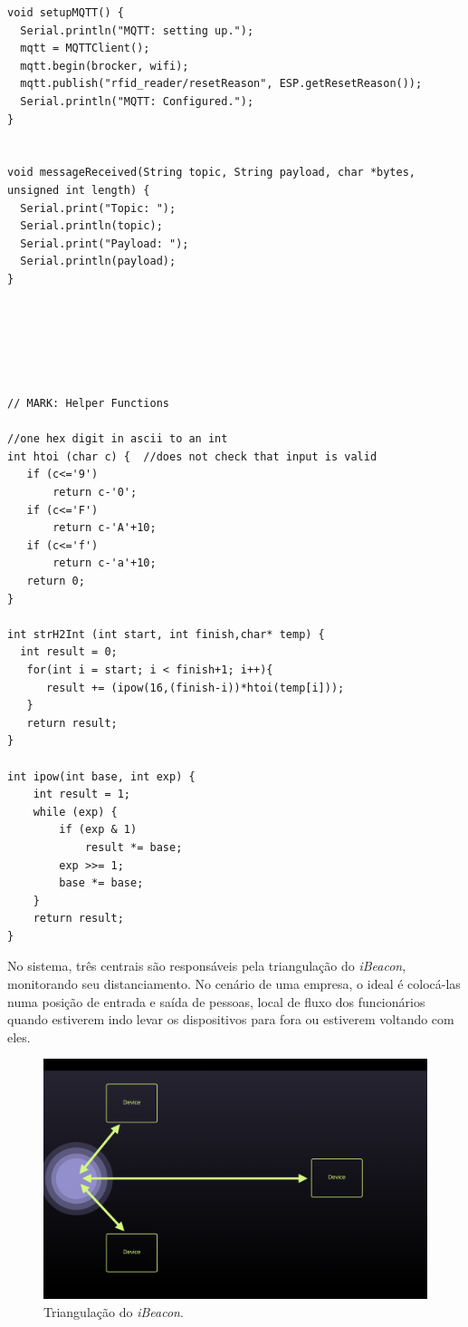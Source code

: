 \documentclass[
	12pt,				%
	openright,			%
	twoside,			%
	a4paper,			%
	english,			%
	french,				%
	spanish,			%
	brazil				%
	]{abntex2}
\begin{document}
\begin{lstlisting}[label={list:main},caption=Código-Fonte rodando no ESP8266.]
void setupMQTT() {
  Serial.println("MQTT: setting up.");
  mqtt = MQTTClient();
  mqtt.begin(brocker, wifi);
  mqtt.publish("rfid_reader/resetReason", ESP.getResetReason());
  Serial.println("MQTT: Configured.");
}


void messageReceived(String topic, String payload, char *bytes, unsigned int length) {
  Serial.print("Topic: ");
  Serial.println(topic);
  Serial.print("Payload: ");
  Serial.println(payload);
}






// MARK: Helper Functions

//one hex digit in ascii to an int
int htoi (char c) {  //does not check that input is valid
   if (c<='9')
       return c-'0';
   if (c<='F')
       return c-'A'+10;
   if (c<='f')
       return c-'a'+10;
   return 0;
}

int strH2Int (int start, int finish,char* temp) { 
  int result = 0;
   for(int i = start; i < finish+1; i++){
      result += (ipow(16,(finish-i))*htoi(temp[i]));
   }
   return result;
}

int ipow(int base, int exp) {
    int result = 1;
    while (exp) {
        if (exp & 1)
            result *= base;
        exp >>= 1;
        base *= base;
    }
    return result;
}
\end{lstlisting}

No sistema, três centrais são responsáveis pela triangulação do \textit{iBeacon}, monitorando seu distanciamento. No cenário de uma empresa, o ideal é colocá-las numa posição de entrada e saída de pessoas, local de fluxo dos funcionários quando estiverem indo levar os dispositivos para fora ou estiverem voltando com eles.

\begin{figure}[t!]
    \centering
    \includegraphics[width=0.7\linewidth]{system}
    \caption{Triangulação do \textit{iBeacon}.}
    \label{fig:system}
\end{figure}
\end{document}
